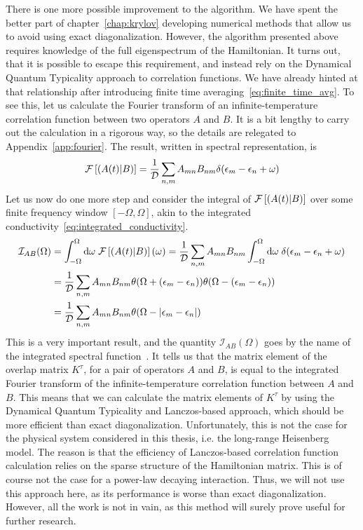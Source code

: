There is one more possible improvement to the algorithm. We have spent the better part of chapter~\ref{chap:krylov}
developing numerical methods that allow us to avoid using exact diagonalization. However, the algorithm presented
above requires knowledge of the full eigenspectrum of the Hamiltonian. It turns out, that it is possible
to escape this requirement, and instead rely on the Dynamical Quantum Typicality approach to correlation functions.
We have already hinted at that relationship after introducing finite time averaging~\eqref{eq:finite_time_avg}.
To see this, let us calculate the Fourier transform of an infinite-temperature correlation function between
two operators \(A\) and \(B\). It is a bit lengthy to carry out the calculation in a rigorous way, so the
details are relegated to Appendix~\ref{app:fourier}. The result, written in spectral representation, is
\begin{equation}
  \mathcal{F}\left[\left(A(t) \middle| B\right)\right] = \frac{1}{\mathcal{D}}\sum_{n,m} A_{mn} B_{nm} \delta(\epsilon_m-\epsilon_n+\omega)
  \label{eq:fourier_corr}
\end{equation}
Let us now do one more step and consider the integral of \(\mathcal{F}\left[\left(A(t) \middle| B\right)\right]\) over
some finite frequency window \([-\Omega, \Omega]\), akin to the integrated conductivity~\eqref{eq:integrated_conductivity}.
\begin{align}
  \mathcal{I}_{AB}(\Omega) & = \int_{-\Omega}^{\Omega} \mathrm{d}\omega\; \mathcal{F}\left[\left(A(t) \middle| B\right)\right](\omega) =
  \frac{1}{\mathcal{D}}\sum_{n,m} A_{mn} B_{nm} \int_{-\Omega}^{\Omega} \mathrm{d}\omega \;
  \delta(\epsilon_m-\epsilon_n+\omega) \nonumber                                                                         \\ &= \frac{1}{\mathcal{D}}\sum_{n,m} A_{mn} B_{nm}
  \theta(\Omega + (\epsilon_m-\epsilon_n))\theta(\Omega - (\epsilon_m-\epsilon_n)) \nonumber                             \\
                           & = \frac{1}{\mathcal{D}}\sum_{n,m} A_{mn} B_{nm}\theta(\Omega - \abs{\epsilon_m-\epsilon_n})
  \label{eq:integrated_spectral}
\end{align}
This is a very important result, and the quantity \(\mathcal{I}_{AB}(\Omega)\) goes by the name of
the integrated spectral function~\autocite{Vidmar2021}.
It tells us that the matrix element of the overlap matrix \(K^{\tau}\),
for a pair of operators \(A\) and \(B\), is equal to the integrated Fourier transform of the infinite-temperature
correlation function between \(A\) and \(B\). This means that we can calculate the matrix elements of \(K^{\tau}\)
by using the Dynamical Quantum Typicality and Lanczos-based approach, which should be more efficient than exact diagonalization.
Unfortunately, this is not the case for the  physical system considered in this thesis,
i.e. the long-range Heisenberg model. The reason is that the efficiency of Lanczos-based
correlation function calculation relies on the sparse structure of the Hamiltonian matrix.
This is of course not the case for a power-law decaying interaction. Thus, we will not use this approach
here, as its performance is worse than exact diagonalization. However, all the work is not in vain, as this method will surely prove useful
for further research.

